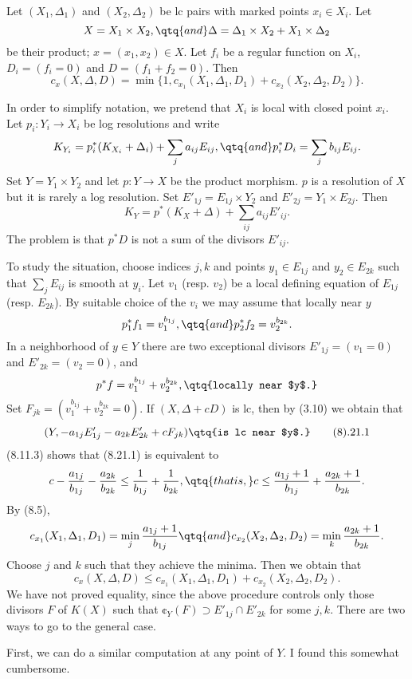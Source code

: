  
  Let $(X_1,\Delta_1)$ and   $(X_2,\Delta_2)$ be
lc pairs with marked points $x_i\in X_i$. Let 
$$
X=X_1\times X_2,\qtq{and} \Delta=\Delta_1\times X_2+X_1\times \Delta_2
$$
be their product; $x=(x_1,x_2)\in X$. Let $f_i$ be a regular function on
$X_i$, 
$D_i=(f_i=0)$ and $D=(f_1+f_2=0)$.  Then
$$
c_x(X,\Delta, D)=\min\{1, c_{x_1}(X_1,\Delta_1, D_1)+
c_{x_2}(X_2,\Delta_2, D_2)\}.
$$
\endproclaim

\demop  In order to simplify notation, we pretend that $X_i$ is  local with
closed point $x_i$.  Let  $p_i:Y_i\to X_i$ be log resolutions and write
$$
K_{Y_i}=p_i^*(K_{X_i}+\Delta_i)+\sum_j a_{ij}E_{ij},
\qtq{and} p_i^*D_i=\sum_j b_{ij}E_{ij}.
$$
Set $Y=Y_1\times Y_2$ and let $p:Y\to X$ be the product morphism. $p$ is a
resolution of $X$ but it is rarely a log resolution. 
Set $E'_{1j}=E_{1j}\times Y_2$ and $E'_{2j}=Y_1\times E_{2j}$. Then
$$
K_{Y}=p^*(K_X+\Delta)+\sum_{ij} a_{ij}E'_{ij}.
$$
The problem is that $p^*D$ is not a sum of the divisors $E'_{ij}$.

To study the situation, choose indices $j,k$ and points $y_1\in E_{1j}$ and
$y_2\in E_{2k}$ such that  $\sum_jE_{ij}$ is smooth at $y_i$.
Let $v_1$ (resp. $v_2$) be a local defining equation of  $E_{1j}$ (resp. 
$E_{2k}$).  By suitable choice of the $v_i$ we may assume that locally near
$y$
$$
p_1^*f_1=v_1^{b_{1j}},\qtq{and} p_2^*f_2=v_2^{b_{2k}}.
$$
In a neighborhood of $y\in Y$ there are two exceptional divisors
$E'_{1j}=(v_1=0)$ and $E'_{2k}=(v_2=0)$, and 
$$
p^*f=v_1^{b_{1j}}+v_2^{b_{2k}},\qtq{locally near $y$.}
$$
Set $F_{jk}=(v_1^{b_{1j}}+v_2^{b_{2k}}=0)$. 
If $(X,\Delta+cD)$ is lc, then by (3.10) we obtain that
$$
(Y, -a_{1j}E'_{1j}-a_{2k}E'_{2k}+cF_{jk}) \qtq{is lc near $y$.}
\tag 8.21.1
$$
  (8.11.3) shows that (8.21.1) is equivalent to
$$
c-\frac{a_{1j}}{b_{1j}}-\frac{a_{2k}}{b_{2k}}\leq 
\frac{1}{b_{1j}}+\frac{1}{b_{2k}},
\qtq{that is,}
c\leq \frac{a_{1j}+1}{b_{1j}}+\frac{a_{2k}+1}{b_{2k}}.
$$
By (8.5), 
$$
c_{x_1}(X_1,\Delta_1, D_1)=\min_j\frac{a_{1j}+1}{b_{1j}}
\qtq{and} 
c_{x_2}(X_2,\Delta_2, D_2)=\min_k\frac{a_{2k}+1}{b_{2k}}.
$$
Choose $j$ and $k$ such that  they achieve the minima. Then we obtain that
$$
c_x(X,\Delta, D)\leq  c_{x_1}(X_1,\Delta_1, D_1)+
c_{x_2}(X_2,\Delta_2, D_2).
$$
We have not proved equality, since the above procedure controls only those
divisors $F$ of $K(X)$ such that $\cent_Y(F)\supset E'_{1j}\cap E'_{2k}$
for some $j,k$. 
There are two ways to go to the general case.

First, we can do a similar computation at any point of $Y$.  I found this
somewhat cumbersome.


